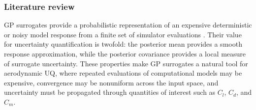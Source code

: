 \documentclass[journal]{new-aiaa}
\newcommand{\bs}{\boldsymbol}
\newcommand{\R}{\mathbb{R}}
\newcommand{\x}{\mathbf{x}}
\begin{document}
%
%

\subsubsection{Literature review}

GP surrogates provide a probabilistic representation of an expensive deterministic or noisy model response from a finite set of simulator evaluations \cite{sacks1989design,santner2003design,Rasmussen2006,gramacy2020surrogates}. Their value for uncertainty quantification is twofold: the posterior mean provides a smooth response approximation, while the posterior covariance provides a local measure of surrogate uncertainty. These properties make GP surrogates a natural tool for aerodynamic UQ, where repeated evaluations of computational models may be expensive, convergence may be nonuniform across the input space, and uncertainty must be propagated through quantities of interest such as $C_l$, $C_d$, and $C_m$. 
\end{document}
